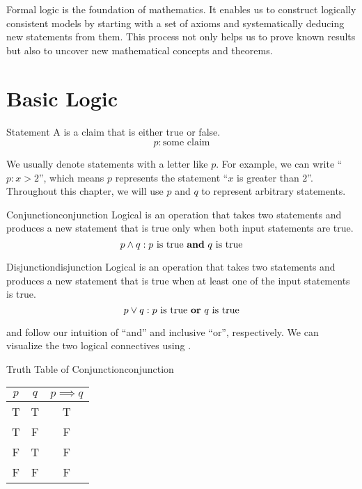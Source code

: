
Formal logic is the foundation of mathematics. It enables us to construct logically consistent models by starting with a set of axioms and systematically deducing new statements from them. This process not only helps us to prove known results but also to uncover new mathematical concepts and theorems.

\section{Basic Logic}
\begin{dfnbox}{Statement}{}
    A  is a claim that is either true or false.
    \tcblower
    \[ p : \text{some claim} \]
\end{dfnbox}

We usually denote statements with a letter like $p$. For example, we can write ``$p: x > 2$'', which means $p$ represents the statement ``$x$ is greater than $2$''. Throughout this chapter, we will use $p$ and $q$ to represent arbitrary statements.

\begin{dfnbox}{Conjunction}{conjunction}
    Logical  is an operation that takes two statements and produces a new statement that is true only when both input statements are true.
    \tcblower
    \[ p \land q : p\ \text{is true \textbf{and}}\ q\ \text{is true} \]
\end{dfnbox}

\begin{dfnbox}{Disjunction}{disjunction}
    Logical  is an operation that takes two statements and produces a new statement that is true when at least one of the input statements is true.    \tcblower
    \[ p \lor q : p\ \text{is true \textbf{or}}\ q\ \text{is true} \]
\end{dfnbox}

 and  follow our intuition of ``and'' and inclusive ``or'', respectively. We can visualize the two logical connectives using .

\begin{exbox}{Truth Table of Conjunction}{conjunction}
    \begin{center}\begin{tabular}{c | c || c}
        $p$ & $q$ & $p \implies q$ \\ \hline
        T & T & T \\
        T & F & F \\
        F & T & F \\
        F & F & F
    \end{tabular}\end{center}
\end{exbox}

